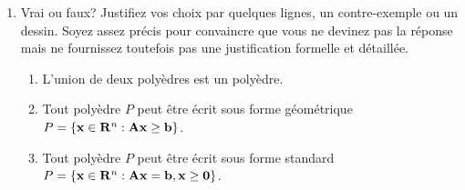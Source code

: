 \begin{enumerate}
  \item Vrai ou faux? Justifiez vos choix par quelques lignes, un contre-exemple ou un dessin. Soyez assez précis pour convaincre
    que vous ne devinez pas la réponse mais ne fournissez toutefois pas une justification formelle et détaillée.

    \begin{enumerate}


      \item L'union de deux polyèdres est un polyèdre.



      \item Tout polyèdre $P$ peut être écrit sous forme géométrique $P=\{ {\bf x} \in {\bf R}^n: \bf A \bf x\geq \bf b\}$.

      \item Tout polyèdre $P$ peut être écrit sous forme standard
        $P=\{ {\bf x} \in {\bf R}^n: \bf A \bf x= \bf b, \bf x \geq 0\}$.










\end{enumerate}
\end{enumerate}
